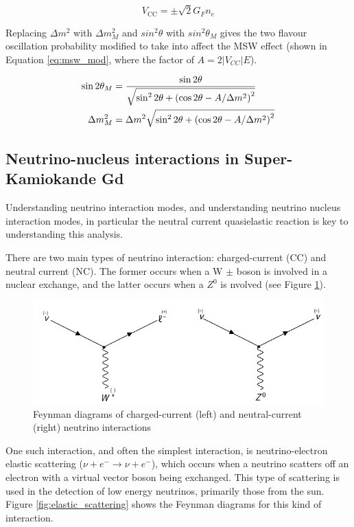 \begin{equation}
    V_{\mathrm{CC}}=\pm \sqrt{2} G_{F} n_{e}
\label{eq:msw_vcc}
\end{equation}

Replacing $\Delta m^{2}$ with $\Delta m^{2}_{M}$ and $sin^{2}\theta$ with $sin^{2}\theta_{M}$ gives the two flavour oscillation probability modified to take into affect the MSW effect (shown in Equation \ref{eq:msw_mod}, where the factor of $A = 2|V_{CC}|E$).


\begin{align}
\sin 2 \theta_{M} &=\frac{\sin 2 \theta}{\sqrt{\sin ^{2} 2 \theta+\left(\cos 2 \theta-A / \Delta m^{2}\right)^{2}}} \label{eq:msw_mod}\\
\Delta m_{M}^{2} &=\Delta m^{2} \sqrt{\sin ^{2} 2 \theta+\left(\cos 2 \theta-A / \Delta m^{2}\right)^{2}} \notag
\end{align}



\subsection{Neutrino-nucleus interactions in Super-Kamiokande Gd}
Understanding neutrino interaction modes, and understanding neutrino nucleus interaction modes, in particular the neutral current quasielastic reaction is key to understanding this analysis. 

There are two main types of neutrino interaction: charged-current (CC) and neutral current (NC). The former occurs when a W $\pm$ boson is involved in a nuclear exchange, and the latter occurs when a $Z^{0}$ is nvolved (see Figure \ref{fig:CC_NC}).

\begin{figure}
    \includegraphics[width=\textwidth]{Figures/CC_NC.png}
    \caption{Feynman diagrams of charged-current (left) and neutral-current (right) neutrino interactions}
    \label{fig:CC_NC}
\end{figure}


One such interaction, and often the simplest interaction, is neutrino-electron elastic scattering ($\nu+e^{-} \rightarrow \nu+e^{-}$), which occurs when a neutrino scatters off an electron with a virtual vector boson being exchanged. This type of scattering is used in the detection of low energy neutrinos, primarily those from the sun. Figure \ref{fig:elastic_scattering} shows the Feynman diagrams for this kind of interaction.

